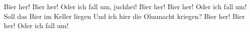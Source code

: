 \begin{verse*}
Bier her! Bier her! 
Oder ich fall um, juchhei!
Bier her! Bier her!
Oder ich fall um!
Soll das Bier im Keller liegen
Und ich hier die Ohnmacht kriegen?
Bier her! Bier her!
Oder ich fall um! 
\end{verse*}
